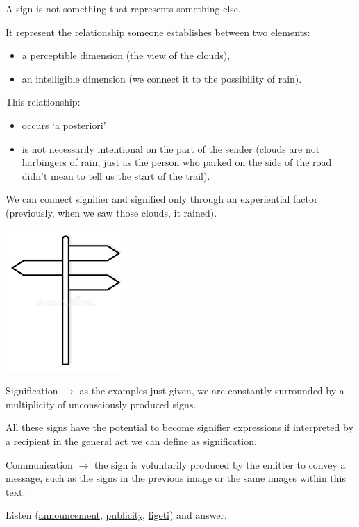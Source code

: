 A sign is not something that represents something else.

It represent the relationship someone establishes between two elements:

\begin{itemize}
\item a perceptible dimension (the view of the clouds), 
\item  an intelligible dimension (we connect it to the possibility of rain).
\end{itemize}

This relationship: 

\begin{itemize}
\item occurs `a posteriori'
\item is not necessarily intentional on the part of the sender (clouds are not harbingers of rain, just as the person who parked on the side of the road didn't mean to tell us the start of the trail).
\end{itemize}
We can connect signifier and signified only through an experiential factor (previously, when we saw those clouds, it rained).

\begin{center}
\includegraphics[scale=0.4]{../img/cartello.png}
\end{center}

Signification \(\rightarrow\) as the examples just given, we are constantly surrounded by a multiplicity of unconsciously produced signs.

All these signs have the potential to become signifier expressions if interpreted by a recipient in the general act we can define as signification.

Communication \(\rightarrow\) the sign is voluntarily produced by the emitter to convey a message, such as the signs in the previous image or the same images within this text.

Listen (\href{https://github.com/musicaecodice/EMC/blob/main/1_premises/suoni/annuncio.mp3}{announcement}, \href{https://github.com/musicaecodice/EMC/blob/main/1_premises/suoni/pubbli.mp3}{publicity}, \href{https://github.com/musicaecodice/EMC/blob/main/1_premises/suoni/ligeti.mp3}{ligeti}) and answer.

